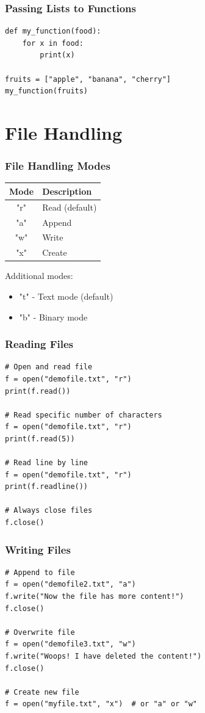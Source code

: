 \documentclass[aspectratio=169]{beamer}
\begin{document}
\begin{frame}[fragile]
\frametitle{Passing Lists to Functions}
\begin{lstlisting}
def my_function(food):
    for x in food:
        print(x)

fruits = ["apple", "banana", "cherry"]
my_function(fruits)
\end{lstlisting}
\end{frame}

\section{File Handling}

\begin{frame}
\frametitle{File Handling Modes}
\begin{center}
\begin{tabular}{|c|l|}
\hline
\textbf{Mode} & \textbf{Description} \\
\hline
"r" & Read (default) \\
"a" & Append \\
"w" & Write \\
"x" & Create \\
\hline
\end{tabular}
\end{center}

Additional modes:
\begin{itemize}
\item "t" - Text mode (default)
\item "b" - Binary mode
\end{itemize}
\end{frame}

\begin{frame}[fragile]
\frametitle{Reading Files}
\begin{lstlisting}
# Open and read file
f = open("demofile.txt", "r")
print(f.read())

# Read specific number of characters
f = open("demofile.txt", "r")
print(f.read(5))

# Read line by line
f = open("demofile.txt", "r")
print(f.readline())

# Always close files
f.close()
\end{lstlisting}
\end{frame}

\begin{frame}[fragile]
\frametitle{Writing Files}
\begin{lstlisting}
# Append to file
f = open("demofile2.txt", "a")
f.write("Now the file has more content!")
f.close()

# Overwrite file
f = open("demofile3.txt", "w")
f.write("Woops! I have deleted the content!")
f.close()

# Create new file
f = open("myfile.txt", "x")  # or "a" or "w"
\end{lstlisting}
\end{frame}
\end{document}
